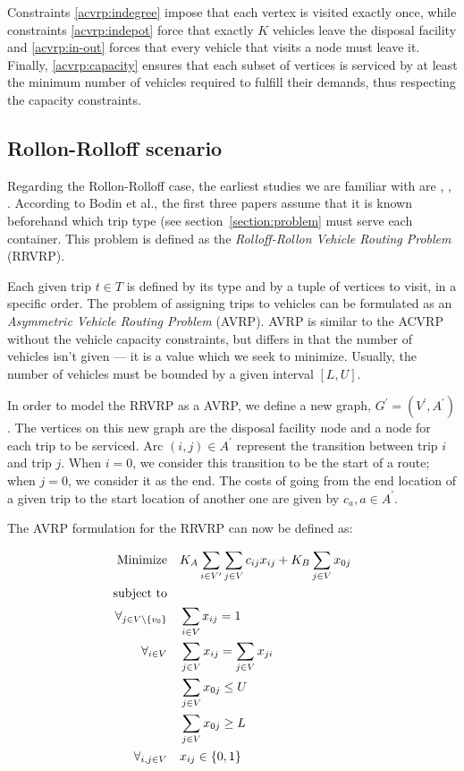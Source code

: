 Constraints \eqref{acvrp:indegree} impose that each vertex is visited exactly
once, while constraints \eqref{acvrp:indepot} force that exactly $K$ vehicles
leave the disposal facility and \eqref{acvrp:in-out} forces that every vehicle
that visits a node must leave it. Finally, \eqref{acvrp:capacity} ensures that
each subset of vertices is serviced by at least the minimum number of vehicles
required to fulfill their demands, thus respecting the capacity constraints.





\subsection{Rollon-Rolloff scenario}

Regarding the Rollon-Rolloff case, the earliest studies we are familiar with
are \citet{Cristallo94}, \citet{Meulemeester97}, \citet{Bodin00}. According to
Bodin et al., the first three papers assume that it is known beforehand which
trip type (see section~\ref{section:problem} must serve each container. This
problem is defined as the \textit{Rolloff-Rollon Vehicle Routing Problem}
(RRVRP).

Each given trip $t \in T$ is defined by its type and by a tuple of vertices to
visit, in a specific order. The problem of assigning trips to vehicles can be
formulated as an \textit{Asymmetric Vehicle Routing Problem} (AVRP). AVRP is
similar to the ACVRP without the vehicle capacity constraints, but differs in
that the number of vehicles isn't given --- it is a value which we seek to
minimize. Usually, the number of vehicles must be bounded by a given interval
$[L, U]$.

In order to model the RRVRP as a AVRP, we define a new graph, $G^\prime =
(V^\prime, A^\prime)$. The vertices on this new graph are the disposal facility
node and a node for each trip to be serviced. Arc $(i, j) \in A^\prime$
represent the transition between trip $i$ and trip $j$. When $i = 0$, we
consider this transition to be the start of a route; when $j = 0$, we consider
it as the end. The costs of going from the end location of a given trip to the
start location of another one are given by $c_{a}, a \in A^\prime$.

The AVRP formulation for the RRVRP can now be defined as:

\begin{align}
	\mbox{Minimize} & \quad K_A \sum_{i \in V^\prime} \sum_{j \in V} c_{ij} x_{ij} + K_B \sum_{j \in V} x_{0j}
	\\
	\mbox{subject to} & \notag{}
	\\
	\forall_{j \in V \setminus \{v_0\}} & \quad \sum_{i \in V} x_{ij} = 1
	\label{avrp:indegree}
	\\
	\forall_{i \in V} & \quad \sum_{j \in V} x_{ij} = \sum_{j \in V} x_{ji}
	\label{avrp:in-out}
	\\
	& \quad \sum_{j \in V} x_{0j} \leq U \label{avrp:upper-k} \\
	& \quad \sum_{j \in V} x_{0j} \geq L \label{avrp:lower-k} \\
	\forall_{i, j \in V} & \quad x_{ij} \in \{0, 1\}
\end{align}


